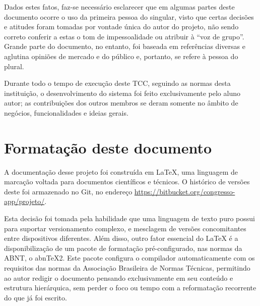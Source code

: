 \documentclass[12pt,a4paper,twoside,hyphens,english,brazil]{abntex2}
\begin{document}
\begin{KeepFromToc}
Dados estes fatos, faz-se necessário esclarecer que em algumas partes deste documento ocorre o uso da primeira pessoa do singular, visto que certas decisões e atitudes foram tomadas por vontade única do autor do projeto, não sendo correto conferir a estas o tom de impessoalidade ou atribuir à ``voz de grupo''. Grande parte do documento, no entanto, foi baseada em referências diversas e aglutina opiniões de mercado e do público e, portanto, se refere à pessoa do plural.


Durante todo o tempo de execução deste TCC, seguindo as normas desta instituição, o desenvolvimento do sistema foi feito exclusivamente pelo aluno autor; as contribuições dos outros membros se deram somente no âmbito de negócios, funcionalidades e ideias gerais.

\section*{Formatação deste documento}
A documentação desse projeto foi construída em \LaTeX, uma linguagem de marcação voltada para documentos científicos e técnicos. O histórico de versões deste foi armazenado no Git, no endereço \url{https://bitbucket.org/congresso-app/projeto/}.

Esta decisão foi tomada pela habilidade que uma linguagem de texto puro possui para suportar versionamento complexo, e mesclagem de versões concomitantes entre dispositivos diferentes. Além disso, outro fator essencial do \LaTeX{} é a disponibilização de um pacote de formatação pré-configurado, nas normas da ABNT, o abn\TeX{}2\cite{abntex2}\cite{abntex2-slides}. Este pacote configura o compilador automaticamente com os requisitos das normas da Associação Brasileira de Normas Técnicas, permitindo ao autor redigir o documento pensando exclusivamente em seu conteúdo e estrutura hierárquica, sem perder o foco ou tempo com a reformatação recorrente do que já foi escrito.
\end{KeepFromToc}

\textual
\end{document}
